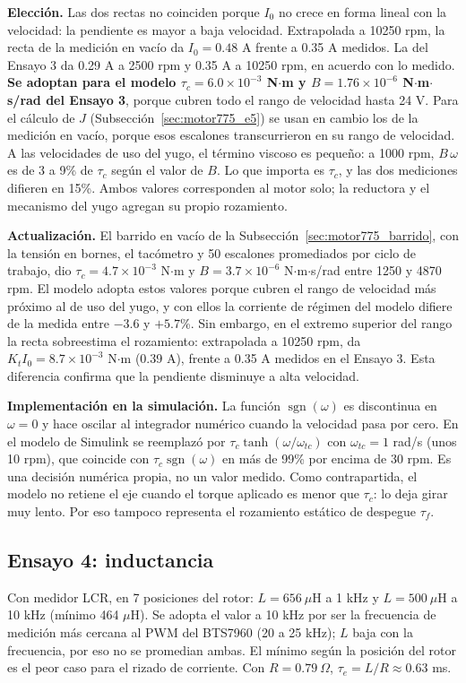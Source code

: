 \textbf{Elección.} Las dos rectas no coinciden porque $I_0$ no crece en forma lineal con la velocidad: la pendiente es mayor a baja velocidad. Extrapolada a 10250 rpm, la recta de la medición en vacío da $I_0 = 0.48$ A frente a 0.35 A medidos. La del Ensayo 3 da 0.29 A a 2500 rpm y 0.35 A a 10250 rpm, en acuerdo con lo medido. \textbf{Se adoptan para el modelo $\tau_c = 6.0\times10^{-3}$ N$\cdot$m y $B = 1.76\times10^{-6}$ N$\cdot$m$\cdot$s/rad del Ensayo 3}, porque cubren todo el rango de velocidad hasta 24 V. Para el cálculo de $J$ (Subsección~\ref{sec:motor775_e5}) se usan en cambio los de la medición en vacío, porque esos escalones transcurrieron en su rango de velocidad. A las velocidades de uso del yugo, el término viscoso es pequeño: a 1000 rpm, $B\,\omega$ es de 3 a 9\% de $\tau_c$ según el valor de $B$. Lo que importa es $\tau_c$, y las dos mediciones difieren en 15\%. Ambos valores corresponden al motor solo; la reductora y el mecanismo del yugo agregan su propio rozamiento.

\textbf{Actualización.} El barrido en vacío de la Subsección~\ref{sec:motor775_barrido}, con la tensión en bornes, el tacómetro y 50 escalones promediados por ciclo de trabajo, dio $\tau_c = 4.7\times10^{-3}$ N$\cdot$m y $B = 3.7\times10^{-6}$ N$\cdot$m$\cdot$s/rad entre 1250 y 4870 rpm. El modelo adopta estos valores porque cubren el rango de velocidad más próximo al de uso del yugo, y con ellos la corriente de régimen del modelo difiere de la medida entre $-3.6$ y $+5.7$\%. Sin embargo, en el extremo superior del rango la recta sobreestima el rozamiento: extrapolada a 10250 rpm, da $K_t I_0 = 8.7\times10^{-3}$ N$\cdot$m (0.39 A), frente a 0.35 A medidos en el Ensayo 3. Esta diferencia confirma que la pendiente disminuye a alta velocidad.

\textbf{Implementación en la simulación.} La función $\operatorname{sgn}(\omega)$ es discontinua en $\omega = 0$ y hace oscilar al integrador numérico cuando la velocidad pasa por cero. En el modelo de Simulink se reemplazó por $\tau_c\tanh(\omega/\omega_{tc})$ con $\omega_{tc} = 1$ rad/s (unos 10 rpm), que coincide con $\tau_c\operatorname{sgn}(\omega)$ en más de 99\% por encima de 30 rpm. Es una decisión numérica propia, no un valor medido. Como contrapartida, el modelo no retiene el eje cuando el torque aplicado es menor que $\tau_c$: lo deja girar muy lento. Por eso tampoco representa el rozamiento estático de despegue $\tau_f$.

\subsection{Ensayo 4: inductancia}
\label{sec:motor775_e4}
Con medidor LCR, en 7 posiciones del rotor: $L = 656\ \mu$H a 1 kHz y $L = 500\ \mu$H a 10 kHz (mínimo 464 $\mu$H). Se adopta el valor a 10 kHz por ser la frecuencia de medición más cercana al PWM del BTS7960 (20 a 25 kHz); $L$ baja con la frecuencia, por eso no se promedian ambas. El mínimo según la posición del rotor es el peor caso para el rizado de corriente. Con $R = 0.79\ \Omega$, $\tau_e = L/R \approx 0.63$ ms.

